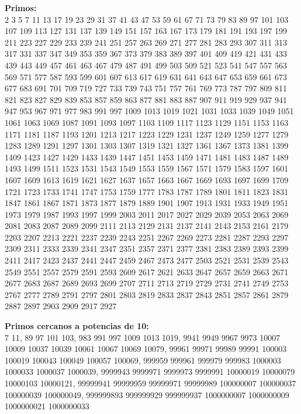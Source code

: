 \documentclass[10pt,landscape,twocolumn,a4paper,notitlepage]{article}
\begin{document}
		\textbf{Primos:}\\
		\vspace{3mm}
			2 3 5 7 11 13 17 19 23 29 31 37 41 43 47 53 59 61 67 71 73 79 83 89 97 101 103 107 109 113 127 131 137 139
			149 151 157 163 167 173 179 181 191 193 197 199 211 223 227 229 233 239 241 251 257 263 269 271 277 281 283
			293 307 311 313 317 331 337 347 349 353 359 367 373 379 383 389 397 401 409 419 421 431 433 439 443 449 457
			461 463 467 479 487 491 499 503 509 521 523 541 547 557 563 569 571 577 587 593 599 601 607 613 617 619 631
			641 643 647 653 659 661 673 677 683 691 701 709 719 727 733 739 743 751 757 761 769 773 787 797 809 811 821
			823 827 829 839 853
			857 859 863 877 881 883 887 907 911 919 929 937 941 947 953 967 971 977 983 991 997 1009 1013 1019 1021 1031
			1033 1039 1049 1051 1061 1063 1069 1087 1091 1093 1097 1103 1109 1117 1123 1129 1151 1153 1163 1171 1181 1187
			1193 1201 1213 1217 1223 1229 1231 1237 1249 1259 1277 1279 1283 1289 1291 1297 1301 1303 1307 1319 1321 1327
			1361 1367 1373 1381 1399 1409 1423 1427 1429 1433 1439 1447 1451 1453 1459 1471 1481 1483 1487 1489 1493 1499
			1511 1523 1531 1543 1549 1553 1559 1567 1571 1579 1583 1597 1601 1607 1609 1613 1619 1621 1627 1637 1657 1663
			1667 1669 1693 1697 1699 1709 1721 1723 1733 1741 1747 1753 1759 1777 1783 1787 1789 1801 1811 1823 1831 1847
			1861 1867 1871 1873 1877 1879 1889 1901 1907 1913 1931 1933 1949 1951 1973 1979 1987 1993 1997 1999 2003 2011
			2017 2027 2029 2039 2053 2063 2069 2081 2083 2087 2089 2099 2111 2113 2129 2131 2137 2141 2143 2153 2161 2179
			2203 2207 2213 2221 2237 2239 2243 2251 2267 2269 2273 2281 2287 2293 2297 2309 2311 2333 2339 2341 2347 2351
			2357 2371 2377 2381 2383 2389 2393 2399 2411 2417 2423 2437 2441 2447 2459 2467 2473 2477 2503 2521 2531 2539
			2543 2549 2551 2557 2579 2591 2593 2609 2617 2621 2633 2647 2657 2659 2663 2671 2677 2683 2687 2689 2693 2699
			2707 2711 2713 2719 2729 2731 2741 2749 2753 2767 2777 2789 2791 2797 2801 2803 2819 2833 2837 2843 2851 2857
			2861 2879 2887 2897 2903 2909 2917 2927

	\vspace{8mm}
	\textbf{Primos cercanos a potencias de 10:}\\
	\vspace{3mm}
	7 11, 89 97 101 103, 983 991 997 1009 1013 1019, 
	9941 9949 9967 9973 10007 10009 10037 10039 10061 10067 10069 10079, 
	99961 99971 99989 99991 100003 100019 100043 100049 100057 100069, 
	999959 999961 999979 999983 1000003 1000033 1000037 1000039,
	9999943 9999971 9999973 9999991 10000019 10000079 10000103 10000121,
	99999941 99999959 99999971 99999989 100000007 100000037 100000039 100000049,
	999999893 999999929 999999937 1000000007 1000000009 1000000021 1000000033
	
\end{document}
